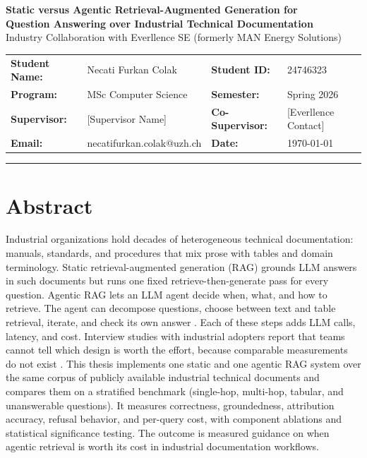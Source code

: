 \documentclass[10pt,a4paper]{article}
\begin{document}
\begin{center}
    {\Large \textbf{Static versus Agentic Retrieval-Augmented Generation for\\[0.15em]Question Answering over Industrial Technical Documentation}}\\[0.3em]
    {\normalsize Industry Collaboration with Everllence SE (formerly MAN Energy Solutions)}
\end{center}

\vspace{0.35em}

\noindent
\begin{tabularx}{\textwidth}{>{\bfseries}l X >{\bfseries}l X}
Student Name: & Necati Furkan Colak       & Student ID:    & 24746323 \\
Program:      & MSc Computer Science      & Semester:      & Spring 2026 \\
Supervisor:   & [Supervisor Name]         & Co-Supervisor: & [Everllence Contact] \\
Email:        & necatifurkan.colak@uzh.ch & Date:          & \today \\
\end{tabularx}

\vspace{0.5em}
\hrule
\vspace{0.5em}

\section{Abstract}

Industrial organizations hold decades of heterogeneous technical documentation: manuals, standards, and procedures that mix prose with tables and domain terminology. Static retrieval-augmented generation (RAG) \cite{lewis2020rag} grounds LLM answers in such documents but runs one fixed retrieve-then-generate pass for every question. Agentic RAG lets an LLM agent decide when, what, and how to retrieve. The agent can decompose questions, choose between text and table retrieval, iterate, and check its own answer \cite{yao2023react, singh2025agentic}. Each of these steps adds LLM calls, latency, and cost. Interview studies with industrial adopters report that teams cannot tell which design is worth the effort, because comparable measurements do not exist \cite{ragindustry2025}. This thesis implements one static and one agentic RAG system over the same corpus of publicly available industrial technical documents and compares them on a stratified benchmark (single-hop, multi-hop, tabular, and unanswerable questions). It measures correctness, groundedness, attribution accuracy, refusal behavior, and per-query cost, with component ablations and statistical significance testing. The outcome is measured guidance on when agentic retrieval is worth its cost in industrial documentation workflows.
\end{document}
